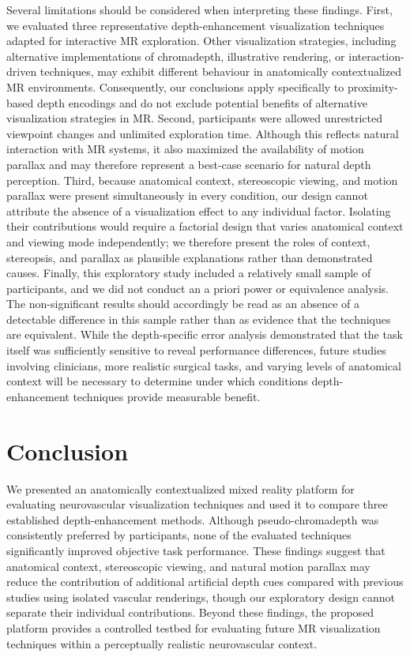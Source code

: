 \documentclass[runningheads]{llncs}
\begin{document}
Several limitations should be considered when interpreting these findings. First, we evaluated three representative depth-enhancement visualization techniques adapted for interactive MR exploration. Other visualization strategies, including alternative implementations of chromadepth, illustrative rendering, or interaction-driven techniques, may exhibit different behaviour in anatomically contextualized MR environments. Consequently, our conclusions apply specifically to proximity-based depth encodings and do not exclude potential benefits of alternative visualization strategies in MR. Second, participants were allowed unrestricted viewpoint changes and unlimited exploration time. Although this reflects natural interaction with MR systems, it also maximized the availability of motion parallax and may therefore represent a best-case scenario for natural depth perception. Third, because anatomical context, stereoscopic viewing, and motion parallax were present simultaneously in every condition, our design cannot attribute the absence of a visualization effect to any individual factor. Isolating their contributions would require a factorial design that varies anatomical context and viewing mode independently; we therefore present the roles of context, stereopsis, and parallax as plausible explanations rather than demonstrated causes. Finally, this exploratory study included a relatively small sample of participants, and we did not conduct an a priori power or equivalence analysis. The non-significant results should accordingly be read as an absence of a detectable difference in this sample rather than as evidence that the techniques are equivalent. While the depth-specific error analysis demonstrated that the task itself was sufficiently sensitive to reveal performance differences, future studies involving clinicians, more realistic surgical tasks, and varying levels of anatomical context will be necessary to determine under which conditions depth-enhancement techniques provide measurable benefit.

\section{Conclusion}
We presented an anatomically contextualized mixed reality platform for evaluating neurovascular visualization techniques and used it to compare three established depth-enhancement methods. Although pseudo-chromadepth was consistently preferred by participants, none of the evaluated techniques significantly improved objective task performance. These findings suggest that anatomical context, stereoscopic viewing, and natural motion parallax may reduce the contribution of additional artificial depth cues compared with previous studies using isolated vascular renderings, though our exploratory design cannot separate their individual contributions. Beyond these findings, the proposed platform provides a controlled testbed for evaluating future MR visualization techniques within a perceptually realistic neurovascular context.
\end{document}

